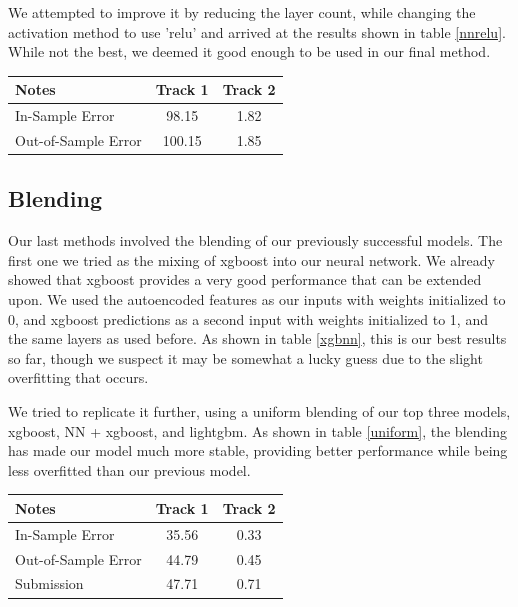 \documentclass[a4paper, 12pt]{article}
\begin{document}
\begin{multicols}{2}
            We attempted to improve it by reducing the layer count, while changing the activation method to use 'relu' and arrived at the results shown in table \ref{nnrelu}. While not the best, we deemed it good enough to be used in our final method.

            \begin{center}
                \begin{tabular}{l|cc}
                    Notes & Track 1 & Track 2 \\
                    \hline
                    In-Sample Error & 98.15 & 1.82 \\
                    Out-of-Sample Error & 100.15 & 1.85 \\
                \end{tabular}
                \label{nnrelu}
            \end{center}

            \subsection{Blending}
                Our last methods involved the blending of our previously successful models. The first one we tried as the mixing of xgboost into our neural network. We already showed that xgboost provides a very good performance that can be extended upon. We used the autoencoded features as our inputs with weights initialized to 0, and xgboost predictions as a second input with weights initialized to 1, and the same layers as used before. As shown in table \ref{xgbnn}, this is our best results so far, though we suspect it may be somewhat a lucky guess due to the slight overfitting that occurs.

                We tried to replicate it further, using a uniform blending of our top three models, xgboost, NN + xgboost, and lightgbm. As shown in table \ref {uniform}, the blending has made our model much more stable, providing better performance while being less overfitted than our previous model.
                \begin{center}
                    \begin{tabular}{l|cc}
                        Notes & Track 1 & Track 2 \\
                        \hline
                        In-Sample Error & 35.56 & 0.33 \\
                        Out-of-Sample Error & 44.79 & 0.45 \\
                        Submission & 47.71 & 0.71
                    \end{tabular}
                    \label{xgbnn}
                \end{center}


\end{multicols}
\end{document}
